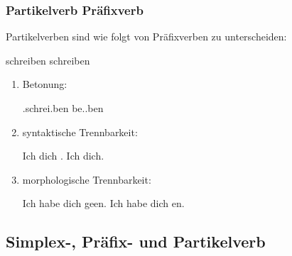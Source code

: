 \begin{frame}
\frametitle{Partikelverb \vs Präfixverb}

Partikelverben sind wie folgt von Präfixverben zu unterscheiden:

\ea  
\ea {}schreiben 
\ex {}schreiben
\z 
\z	
\begin{enumerate}
\item Betonung:

\ea \textipa{\textprimstress}.schrei.ben \vs be.\textipa{\textprimstress}.ben
\z

\item syntaktische Trennbarkeit:

\eal
\ex Ich  dich .
\ex Ich  dich.
\zl

\item morphologische Trennbarkeit:

\eal 
\ex Ich habe dich geen. 
\ex Ich habe dich en.
\zl

\end{enumerate}

\end{frame}


\subsection{Simplex-, Präfix- und  Partikelverb}

